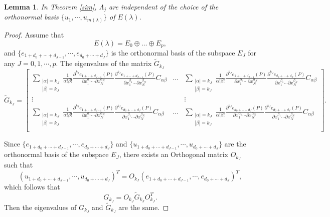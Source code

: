 \documentclass[11pt,reqno]{article}
\newtheorem{lemma}[teo]{Lemma}
\numberwithin{equation}{section}
\newcommand\la\lambda
\begin{document}
 \begin{lemma}\label{ind}
     In Theorem \ref{sim},  $\Lambda_j$  are independent of the 
     choice of the orthonormal basis $\{u_1,\cdots,u_{m(\la)}\}$ of $E(\lambda)$. 
     \end{lemma}
     \begin{proof}
    Assume that \[E(\lambda)=E_0\oplus \dots \oplus E_p,\] 
    and $\{e_{1+d_0+\cdots+d_{J-1}},\cdots,e_{d_0+\cdots+d_J}\}$ is the orthonormal basis of the subspace $E_J$ for any $J=0,1,\cdots,p$.  The eigenvalues of the matrix   $\tilde{G}_{k_J}$
    $$	\!\!\!\!\!\!\!\!\!\!\!\!\!\!\!\!\!\!\!\!\!\!\!
\tilde{G}_{k_J}=\begin{bmatrix}
\displaystyle\sum_{\substack{|\alpha|={ k_J}\\
           |\beta|={ k_J}}}\frac{1}{\alpha!\beta!}\frac{\partial^{{ k_J}} e_{1+..+d_{J-1}} (P)}{\partial x_{1}^{\alpha_1}\cdots\partial x_{N}^{\alpha_N}}\frac{\partial^{{ k_J}} e_{1+..+d_{J-1}} (P)}{\partial x_{1}^{\beta_1}\cdots\partial x_{N}^{\beta_N}} C_{\alpha\beta}&\dots & \displaystyle\sum_{\substack{|\alpha|={ k_J}\\
           |\beta|={ k_J}}}\frac{1}{\alpha!\beta!}\frac{\partial^{{ k_J}} e_{1+..+d_{J-1}} (P)}{\partial x_{1}^{\alpha_1}\cdots\partial x_{N}^{\alpha_N}}\frac{\partial^{{ k_J}} e_{d_0+..+d_J} (P)}{\partial x_{1}^{\beta_1}\cdots\partial x_{N}^{\beta_N}} C_{\alpha\beta}\\
    \vdots&  &\vdots\\
  \displaystyle \sum_{\substack{|\alpha|={ k_J}\\
           |\beta|={ k_J}}}\frac{1}{\alpha!\beta!}\frac{\partial^{{ k_J}} e_{1+..+d_{J-1}} (P)}{\partial x_{1}^{\alpha_1}\cdots\partial x_{N}^{\alpha_N}}\frac{\partial^{{ k_J}} e_{d_0+..+d_J} (P)}{\partial x_{1}^{\beta_1}\cdots\partial x_{N}^{\beta_N}} C_{\alpha\beta} &\dots & \displaystyle\sum_{\substack{|\alpha|={ k_J}\\
           |\beta|={ k_J}}}\frac{1}{\alpha!\beta!}\frac{\partial^{{ k_J}} e_{d_0+..+d_J} (P)}{\partial x_{1}^{\alpha_1}\cdots\partial x_{N}^{\alpha_N}}\frac{\partial^{{ k_J}} e_{d_0+..+d_J} (P)}{\partial x_{1}^{\beta_1}\cdots\partial x_{N}^{\beta_N}} C_{\alpha\beta}\\
\end{bmatrix}.
$$
         
         Since $\{e_{1+d_0+\cdots+d_{J-1}},\cdots,e_{d_0+\cdots+d_J}\}$ and $\{u_{1+d_0+\cdots+d_{J-1}},\cdots,u_{d_0+\cdots+d_J}\}$ are the  orthonormal basis of the subspace $E_J$, there exists an Orthogonal matrix $O_{k_J}$ such that 
       $$
       (u_{1+d_0+\cdots+d_{J-1}},\cdots,u_{d_0+\cdots+d_J})^T=O_{k_J}(e_{1+d_0+\cdots+d_{J-1}},\cdots,e_{d_0+\cdots+d_J})^T,
       $$
which follows that 
$$
G_{k_J}=O_{k_J}\tilde{G}_{k_J}O_{k_J}^T.
$$
Then the eigenvalues of $G_{k_J}$ and $\tilde{G}_{k_J}$ are the same.
 \end{proof}   
\end{document}
